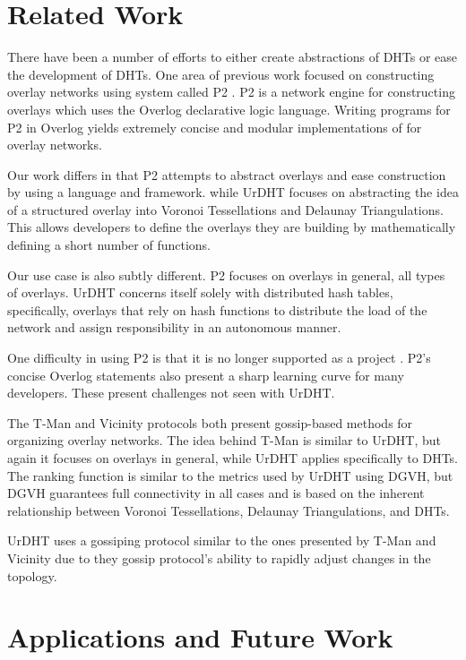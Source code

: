 \section{Related Work}\label{sec:related}

There have been a number of efforts to either create abstractions of DHTs or ease the development of DHTs.
One area of previous work focused on constructing overlay networks using system called P2 \cite{loo2005implementing}.
P2 is a network engine for constructing overlays which uses the Overlog declarative logic language.
Writing programs for P2 in Overlog yields extremely concise and modular implementations of for overlay networks. 

Our work differs in that P2 attempts to abstract overlays and ease construction by using a language and framework. while UrDHT focuses on abstracting the idea of a structured overlay into Voronoi Tessellations and Delaunay Triangulations.
This allows developers to define the overlays they are building by mathematically defining a short number of functions.

Our use case is also subtly different. 
P2 focuses on overlays in general, all types of overlays.
UrDHT concerns itself solely with distributed hash tables, specifically, overlays that rely on hash functions to distribute the load of the network and assign responsibility in an autonomous manner. 

One difficulty in using P2 is that it is no longer supported as a project \cite{loo2005implementing}. 
P2's concise Overlog statements also present a sharp learning curve for many developers.
These present challenges not seen with UrDHT.


The T-Man\cite{jelasity2005t} and Vicinity \cite{voulgaris2005epidemic} protocols both present gossip-based methods for organizing overlay networks.
The idea behind T-Man is similar to UrDHT, but again it focuses on overlays in general, while UrDHT applies specifically to DHTs.
The ranking function is similar to the metrics used by UrDHT using DGVH, but DGVH guarantees full connectivity in all cases and is based on the inherent relationship between Voronoi Tessellations, Delaunay Triangulations, and DHTs.

UrDHT uses a gossiping protocol similar to the ones presented by T-Man and Vicinity due to they gossip protocol's ability to rapidly adjust changes in the topology.


\section{Applications and Future Work}
\label{sec:future}

